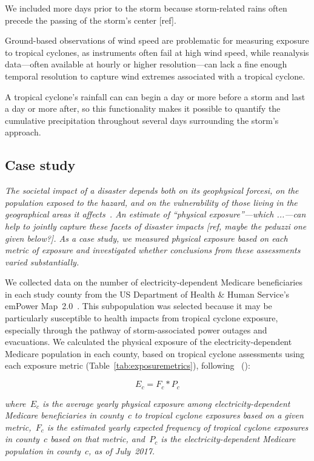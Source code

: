 We included more days prior to the storm because
storm-related rains often precede the passing of the storm's center [ref]. 

Ground-based observations of wind speed are problematic for measuring exposure
to tropical cyclones, as instruments often fail at high wind speed, while
reanalysis data---often available at hourly or higher resolution---can lack a
fine enough temporal resolution to capture wind extremes associated with a
tropical cyclone. 

A tropical cyclone's rainfall can can begin a day or more before a
storm and last a day or more after, so this functionality makes it possible to
quantify the cumulative precipitation throughout several days surrounding the
storm's approach. 

\subsection*{Case study}

\textit{The societal impact of a disaster depends both on its geophysical
forcesi, on the population exposed to the hazard, and on the vulnerability of
those living in the geographical areas it
affects~\parencite{chakraborty2005population, anderson2003community,
cutter1996vulnerability}. An estimate of ``physical exposure''---which
...---can help to jointly capture these facets of disaster impacts [ref, maybe
the peduzzi one given below?]. As a case study, we measured physical exposure
based on each metric of exposure and investigated whether conclusions from
these assessments varied substantially.}

We collected data on the number of electricity-dependent Medicare beneficiaries
in each study county from the \ac{US} Department of Health \& Human Service's
emPower Map~2.0~\parencite{empower}. This subpopulation was selected because it
may be particularly susceptible to health impacts from tropical cyclone
exposure, especially through the pathway of storm-associated power outages and
evacuations. We calculated the physical exposure of the electricity-dependent
Medicare population in each county, based on tropical cyclone assessments using
each exposure metric (Table~\ref{tab:exposuremetrics}), following
\citeauthor*{peduzzi2009assessing}~(\citeyear{peduzzi2009assessing}):

\begin{equation}
E_c = F_c * P_c
\end{equation}

\textit{\noindent where~$E_c$ is the average yearly physical exposure among
electricity-dependent Medicare beneficiaries in county~$c$ to tropical cyclone
exposures based on a given metric,~$F_c$ is the estimated yearly expected
frequency of tropical cyclone exposures in county~$c$ based on that metric,
and~$P_c$ is the electricity-dependent Medicare population in
county~$c$, as of July~2017.}



